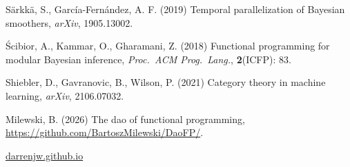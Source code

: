 \documentclass[mathserif,handout]{beamer}
\begin{document}
\begin{frame}
\begin{thebibliography}{}
\bibitem{} Särkkä, S., García-Fernández, A. F. (2019) \alert{Temporal parallelization of Bayesian smoothers}, \emph{arXiv}, 1905.13002.
  

\bibitem{} \'{S}cibior, A., Kammar, O., Gharamani, Z. (2018) \alert{Functional programming for modular Bayesian inference}, \emph{Proc.\ ACM Prog.\ Lang.}, \textbf{2}(ICFP): 83.

\bibitem{} Shiebler, D., Gavranovic, B., Wilson, P. (2021) \alert{Category theory in machine learning}, \emph{arXiv}, 2106.07032.
  
    
    
\beamertemplatebookbibitems

\bibitem[]{} Milewski, B. (2026) \alert{The dao of functional programming}, \url{https://github.com/BartoszMilewski/DaoFP/}.
%
    
  \end{thebibliography}

  \vspace*{0.8ex}

  


\alert{\url{darrenjw.github.io}}%
  
\end{frame}
\end{document}
